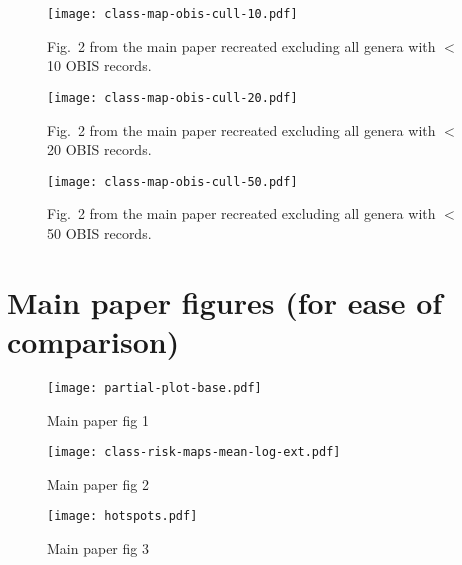 \documentclass[11pt]{article}
\begin{document}
\begin{figure}[htbp]
\begin{center}
  \texttt{[image: class-map-obis-cull-10.pdf]}
\caption{Fig.~2 from the main paper recreated excluding all genera with $<$ 10 OBIS records.}
\label{fig:class-map-obis-cull-10}
\end{center}
\end{figure}

\begin{figure}[htbp]
\begin{center}
  \texttt{[image: class-map-obis-cull-20.pdf]}
\caption{Fig.~2 from the main paper recreated excluding all genera with $<$ 20 OBIS records.}
\label{fig:class-map-obis-cull-20}
\end{center}
\end{figure}

\begin{figure}[htbp]
\begin{center}
  \texttt{[image: class-map-obis-cull-50.pdf]}
\caption{Fig.~2 from the main paper recreated excluding all genera with $<$ 50 OBIS records.}
\label{fig:class-map-obis-cull-50}
\end{center}
\end{figure}

\clearpage

\section{Main paper figures (for ease of comparison)}

\begin{figure}[htbp]
\begin{center}
\texttt{[image: partial-plot-base.pdf]}
\caption{Main paper fig 1}
\label{fig:1}
\end{center}
\end{figure}

\begin{figure}[htbp]
\begin{center}
\texttt{[image: class-risk-maps-mean-log-ext.pdf]}
\caption{Main paper fig 2}
\label{fig:2}
\end{center}
\end{figure}

\begin{figure}[htbp]
\begin{center}
\texttt{[image: hotspots.pdf]}
\caption{Main paper fig 3}
\label{fig:3}
\end{center}
\end{figure}
\end{document}
